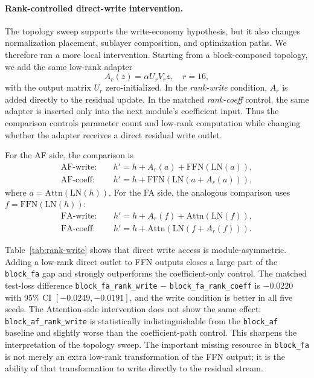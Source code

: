 \documentclass[letterpaper]{article}
\newcommand{\Attn}{\mathrm{Attn}}
\newcommand{\FFN}{\mathrm{FFN}}
\newcommand{\LN}{\mathrm{LN}}
\begin{document}
\paragraph{Rank-controlled direct-write intervention.}
The topology sweep supports the write-economy hypothesis, but it also changes
normalization placement, sublayer composition, and optimization paths. We
therefore ran a more local intervention. Starting from a block-composed
topology, we add the same low-rank adapter
\begin{equation}
A_r(z)=\alpha U_rV_rz,\quad r=16,
\end{equation}
with the output matrix $U_r$ zero-initialized. In the \emph{rank-write}
condition, $A_r$ is added directly to the residual update. In the matched
\emph{rank-coeff} control, the same adapter is inserted only into the next
module's coefficient input. Thus the comparison controls parameter count and
low-rank computation while changing whether the adapter receives a direct
residual write outlet.

For the AF side, the comparison is
\begin{align}
\mathrm{AF\mbox{-}write}:&\quad
h' = h + A_r(a) + \FFN(\LN(a)),\\
\mathrm{AF\mbox{-}coeff}:&\quad
h' = h + \FFN(\LN(a + A_r(a))),
\end{align}
where $a=\Attn(\LN(h))$. For the FA side, the analogous comparison uses
$f=\FFN(\LN(h))$:
\begin{align}
\mathrm{FA\mbox{-}write}:&\quad
h' = h + A_r(f) + \Attn(\LN(f)),\\
\mathrm{FA\mbox{-}coeff}:&\quad
h' = h + \Attn(\LN(f + A_r(f))).
\end{align}

Table~\ref{tab:rank-write} shows that direct write access is
module-asymmetric. Adding a low-rank direct outlet to FFN outputs closes a
large part of the \texttt{block\_fa} gap and strongly outperforms the
coefficient-only control. The matched test-loss difference
\texttt{block\_fa\_rank\_write} $-$ \texttt{block\_fa\_rank\_coeff} is
$-0.0220$ with 95\% CI $[-0.0249,-0.0191]$, and the write condition is better
in all five seeds. The Attention-side intervention does not show the same
effect: \texttt{block\_af\_rank\_write} is statistically indistinguishable
from the \texttt{block\_af} baseline and slightly worse than the
coefficient-path control. This sharpens the interpretation of the topology
sweep. The important missing resource in \texttt{block\_fa} is not merely an
extra low-rank transformation of the FFN output; it is the ability of that
transformation to write directly to the residual stream.
\end{document}
